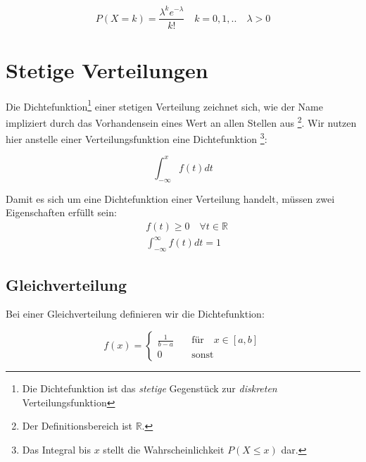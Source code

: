 \documentclass{tufte-handout}
\theoremstyle{own}
\begin{document}
\begin{equation}
	P(X = k) = \frac{\lambda^k e^{-\lambda}}{k!} \hspace{1em} k = 0,1,.. \hspace{1em} \lambda > 0
\end{equation}

\section{Stetige Verteilungen}

Die Dichtefunktion\footnote{Die Dichtefunktion ist das \emph{stetige} Gegenstück zur \emph{diskreten} Verteilungsfunktion}
einer stetigen Verteilung zeichnet sich, wie der Name impliziert durch das Vorhandensein eines Wert an allen Stellen aus
\footnote{Der Definitionsbereich ist $\mathbb{R}$.}. 
Wir nutzen hier anstelle einer Verteilungsfunktion eine Dichtefunktion
\footnote{Das Integral bis $x$ stellt die Wahrscheinlichkeit $P(X \leq x)$ dar.}:

\begin{equation}
	\int_{-\infty}^x f(t) dt 
\end{equation}

Damit es sich um eine Dichtefunktion einer Verteilung handelt, müssen zwei Eigenschaften erfüllt sein:
\begin{align}
&f(t) \geq 0 \hspace{1em} \forall t \in \mathbb{R} \label{dichteeig:1}\\
&\int_{-\infty}^{\infty} f(t) dt =1 \label{dichteeig:2}
\end{align}

\subsection{Gleichverteilung}

Bei einer Gleichverteilung definieren wir die Dichtefunktion:

\begin{equation}
f(x) = \begin{cases}
\frac{1}{b-a} \hspace{1em} &\text{für} \hspace{1em} x \in [a,b] \\
0 \hspace{1em} &\text{sonst}
\end{cases}
\end{equation}
\end{document}
